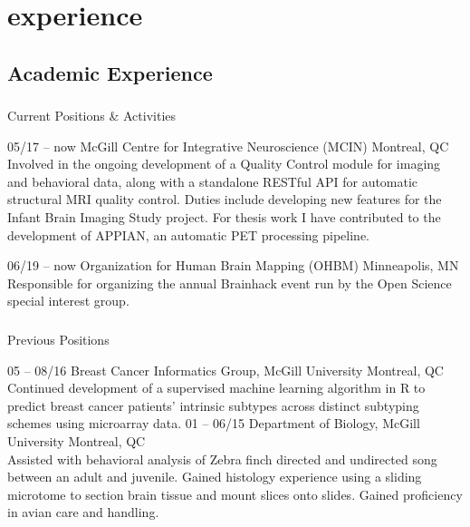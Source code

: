 \documentclass[]{friggeri-cv} %
\begin{document}
\section{experience}

\subsection{Academic Experience}

\subsubsection{}{Current Positions \& Activities}

\begin{entrylist}
\entry
{05/17 -- now}
{McGill Centre for Integrative Neuroscience (MCIN)}
{Montreal, QC}
{ \\
Involved in the ongoing development of a Quality Control module for imaging and
behavioral data, along with a standalone RESTful API for automatic structural MRI
quality control. Duties include developing new features for the Infant Brain Imaging
Study project. For thesis work I have contributed to the development of APPIAN, 
an automatic PET processing pipeline.}

\entry
{06/19 -- now}
{Organization for Human Brain Mapping (OHBM)}
{Minneapolis, MN}
{ \\
Responsible for organizing the annual Brainhack event run by the Open Science special interest group.}
\end{entrylist}

\subsubsection{}{Previous Positions}

\begin{entrylist}
\entry
{05 -- 08/16}
{Breast Cancer Informatics Group, McGill University}
{Montreal, QC}
{\\
Continued development of a supervised machine learning algorithm in R to predict
breast cancer patients' intrinsic subtypes across distinct subtyping schemes
using microarray data.}
\entry
{01 -- 06/15}
{Department of Biology, McGill University}
{Montreal, QC}
{\\
Assisted with behavioral analysis of Zebra finch directed and undirected song
between an adult and juvenile. Gained histology experience using a sliding microtome
to section brain tissue and mount slices onto slides. Gained proficiency in avian care and handling.}
\end{entrylist}
\end{document}
